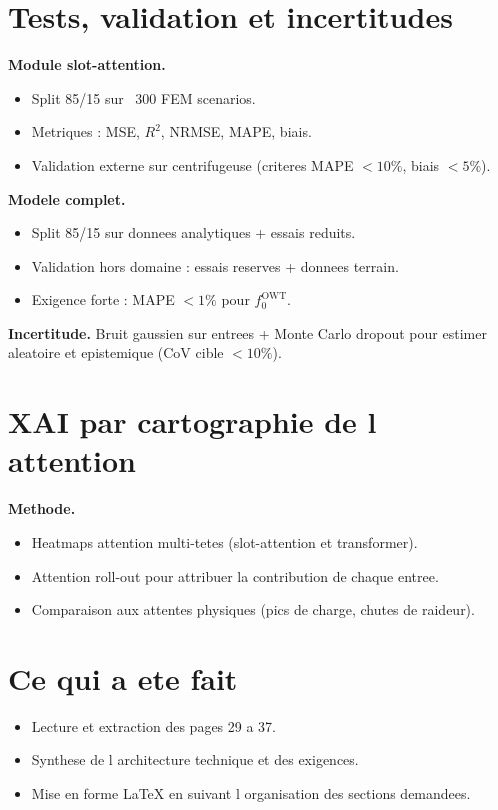 \documentclass[11pt]{article}
\begin{document}
\section{Tests, validation et incertitudes}
\textbf{Module slot-attention.}
\begin{itemize}
  \item Split 85/15 sur ~300 FEM scenarios.
  \item Metriques : MSE, $R^2$, NRMSE, MAPE, biais.
  \item Validation externe sur centrifugeuse (criteres MAPE $< 10\%$, biais $< 5\%$).
\end{itemize}

\textbf{Modele complet.}
\begin{itemize}
  \item Split 85/15 sur donnees analytiques + essais reduits.
  \item Validation hors domaine : essais reserves + donnees terrain.
  \item Exigence forte : MAPE $< 1\%$ pour $f_0^{\mathrm{OWT}}$.
\end{itemize}

\textbf{Incertitude.} Bruit gaussien sur entrees + Monte Carlo dropout pour estimer
aleatoire et epistemique (CoV cible $< 10\%$).

\section{XAI par cartographie de l attention}
\textbf{Methode.}
\begin{itemize}
  \item Heatmaps attention multi-tetes (slot-attention et transformer).
  \item Attention roll-out pour attribuer la contribution de chaque entree.
  \item Comparaison aux attentes physiques (pics de charge, chutes de raideur).
\end{itemize}

\section{Ce qui a ete fait}
\begin{itemize}
  \item Lecture et extraction des pages 29 a 37.
  \item Synthese de l architecture technique et des exigences.
  \item Mise en forme LaTeX en suivant l organisation des sections demandees.
\end{itemize}
\end{document}
